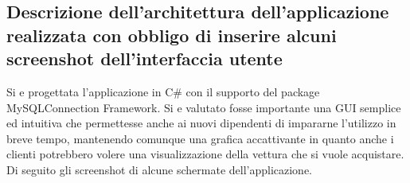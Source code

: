\documentclass[12pt]{article}
\begin{document}
\subsection{Descrizione dell'architettura dell'applicazione
realizzata con obbligo di inserire alcuni screenshot dell'interfaccia utente}

Si e progettata l'applicazione in C\# con il supporto del package
MySQLConnection Framework. Si e valutato fosse importante una GUI semplice ed
intuitiva che permettesse anche ai nuovi dipendenti di impararne l'utilizzo in
breve tempo, mantenendo comunque una grafica accattivante in quanto anche i
clienti potrebbero volere una visualizzazione della vettura che si vuole
acquistare.\\
Di seguito gli screenshot di alcune schermate dell'applicazione.
\end{document}
